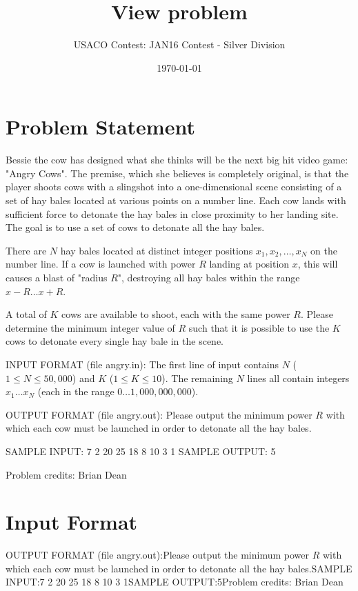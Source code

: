 \documentclass[12pt]{article}
\title{View problem}
\author{USACO Contest: JAN16 Contest - Silver Division}
\date{\today}
\begin{document}
\maketitle

\section*{Problem Statement}

Bessie the cow has designed what she thinks will be the next big hit video game:
"Angry Cows".  The premise,  which she believes is completely original, is that
the player shoots cows with a slingshot into a one-dimensional scene consisting
of a set of hay bales located at various points on a number line. Each cow lands
with sufficient force to detonate the hay bales in close proximity to her
landing site.  The goal is to use a set of cows to detonate all the hay bales.

There are $N$ hay bales located at distinct integer positions
$x_1, x_2, \ldots, x_N$ on the number line.  If a cow is launched with power $R$
landing at position $x$, this will causes a blast of "radius $R$", destroying
all hay bales within the range $x-R \ldots x+R$.  

A total of $K$ cows are available to shoot, each with the same power $R$. Please
determine the minimum integer value of $R$ such that it is possible to use the $K$ cows
to detonate every single hay bale in the scene.

INPUT FORMAT (file angry.in):
The first line of input contains $N$ ($1 \leq N \leq 50,000$) and $K$
($1 \leq K \leq 10$).  The remaining $N$ lines all  contain integers
$x_1 \ldots x_N$ (each in the range
$0 \ldots 1,000,000,000$).

OUTPUT FORMAT (file angry.out):
Please output the minimum power $R$ with which each cow must be launched in order
to detonate all the hay bales.

SAMPLE INPUT:
7 2
20
25
18
8
10
3
1
SAMPLE OUTPUT: 
5

Problem credits: Brian Dean



\section*{Input Format}
OUTPUT FORMAT (file angry.out):Please output the minimum power $R$ with which each cow must be launched in order
to detonate all the hay bales.SAMPLE INPUT:7 2
20
25
18
8
10
3
1SAMPLE OUTPUT:5Problem credits: Brian Dean
\end{document}
